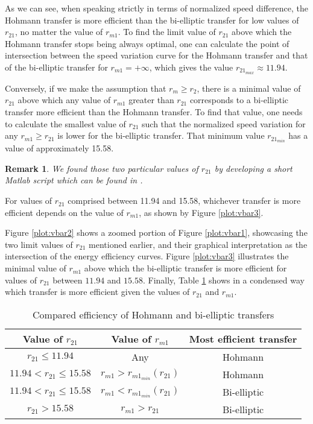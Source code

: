 \documentclass[journal]{IEEEtran}
\newtheorem*{remark}{Remark}
\begin{document}
As we can see, when speaking strictly in terms of normalized speed difference, the Hohmann transfer is more efficient than the bi-elliptic transfer for low values of $r_{21}$, no matter the value of $r_{m1}$. To find the limit value of $r_{21}$ above which the Hohmann transfer stops being always optimal, one can calculate the point of intersection between the speed variation curve for the Hohmann transfer and that of the bi-elliptic transfer for $r_{m1}=+\infty$, which gives the value $r_{{21}_{max}}\approx 11.94$.

Conversely, if we make the assumption that $r_m \geq r_2$, there is a minimal value of 
$r_{21}$ above which any value of $r_{m1}$ greater than $r_{21}$ corresponds to a bi-elliptic transfer more efficient than the Hohmann transfer. To find that value, one needs to calculate the smallest value of $r_{21}$ such that the normalized speed variation for any $r_{m1}\geq r_{21}$ is lower for the bi-elliptic transfer. That minimum value $r_{{21}_{min}}$ has a value of approximately 15.58.

\begin{remark}
We found those two particular values of $r_{21}$ by developing a short Matlab script which can be found in \cite{git_program}.
\end{remark}

For values of $r_{21}$ comprised between 11.94 and 15.58, whichever transfer is more efficient depends on the value of $r_{m1}$, as shown by Figure \ref{plot:vbar3}.

Figure \ref{plot:vbar2} shows a zoomed portion of Figure \ref{plot:vbar1}, showcasing the two limit values of $r_{21}$ mentioned earlier, and their graphical interpretation as the intersection of the energy efficiency curves. Figure \ref{plot:vbar3} illustrates the minimal value of $r_{m1}$ above which the bi-elliptic transfer is more efficient for values of $r_{21}$ between $11.94$ and $15.58$. Finally, Table \ref{table:1} shows in a condensed way which transfer is more efficient given the values of $r_{21}$ and $r_{m1}$.
\begin{table}[h!]
\centering
 \begin{tabular}{| c | c| c |} 
 \hline
 Value of $r_{21}$ & Value of $r_{m1}$ & Most efficient transfer \\
 \hline
 $r_{21} \leq 11.94$ & Any & Hohmann\\
 $11.94 < r_{21}  \leq 15.58$ & $r_{m1} > r_{m1_{min}}(r_{21}) $ &Hohmann\\
 $11.94 < r_{21}  \leq 15.58$ & $r_{m1} < r_{m1_{min}}(r_{21}) $ &Bi-elliptic\\
 $r_{21}> 15.58$ & $r_{m1} > r_{21}$ & Bi-elliptic\\
 \hline
\end{tabular}
\caption{Compared efficiency of Hohmann and bi-elliptic transfers}
\label{table:1}
\end{table}
\end{document}
